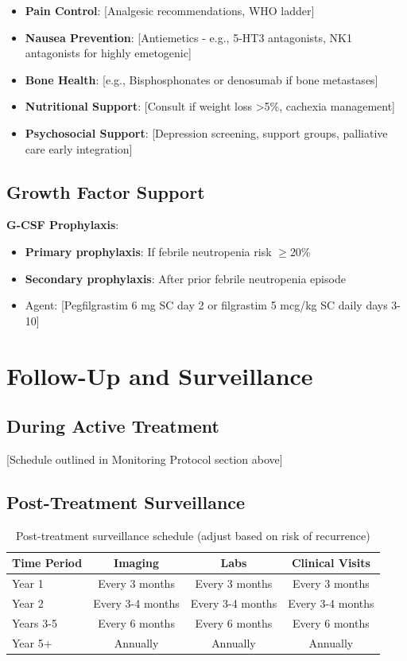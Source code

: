 \documentclass[10pt,letterpaper]{article}
\begin{document}
\begin{itemize}
\item \textbf{Pain Control}: [Analgesic recommendations, WHO ladder]
\item \textbf{Nausea Prevention}: [Antiemetics - e.g., 5-HT3 antagonists, NK1 antagonists for highly emetogenic]
\item \textbf{Bone Health}: [e.g., Bisphosphonates or denosumab if bone metastases]
\item \textbf{Nutritional Support}: [Consult if weight loss >5\%, cachexia management]
\item \textbf{Psychosocial Support}: [Depression screening, support groups, palliative care early integration]
\end{itemize}

\subsection{Growth Factor Support}

\textbf{G-CSF Prophylaxis}:
\begin{itemize}
\item \textbf{Primary prophylaxis}: If febrile neutropenia risk $\geq$20\%
\item \textbf{Secondary prophylaxis}: After prior febrile neutropenia episode
\item Agent: [Pegfilgrastim 6 mg SC day 2 or filgrastim 5 mcg/kg SC daily days 3-10]
\end{itemize}

\section{Follow-Up and Surveillance}

\subsection{During Active Treatment}

[Schedule outlined in Monitoring Protocol section above]

\subsection{Post-Treatment Surveillance}

\begin{table}[H]
\centering
\footnotesize
\begin{tabular}{lccc}
\toprule
\textbf{Time Period} & \textbf{Imaging} & \textbf{Labs} & \textbf{Clinical Visits} \\
\midrule
Year 1 & Every 3 months & Every 3 months & Every 3 months \\
Year 2 & Every 3-4 months & Every 3-4 months & Every 3-4 months \\
Years 3-5 & Every 6 months & Every 6 months & Every 6 months \\
Year 5+ & Annually & Annually & Annually \\
\bottomrule
\end{tabular}
\caption{Post-treatment surveillance schedule (adjust based on risk of recurrence)}
\end{table}
\end{document}
